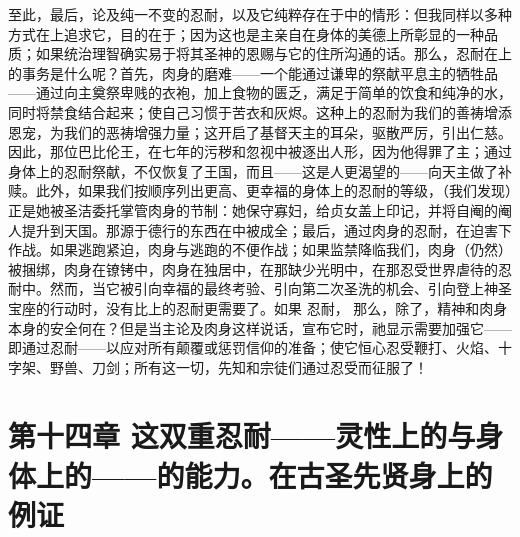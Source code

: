 至此，最后，论及纯一不变的忍耐，以及它纯粹存在于中的情形：但我同样以多种方式在上追求它，目的在于；因为这也是主亲自在身体的美德上所彰显的一种品质；如果统治理智确实易于将其圣神的恩赐与它的住所沟通的话。那么，忍耐在上的事务是什么呢？首先，肉身的磨难——一个能通过谦卑的祭献平息主的牺牲品——通过向主奠祭卑贱的衣袍，加上食物的匮乏，满足于简单的饮食和纯净的水，同时将禁食结合起来；使自己习惯于苦衣和灰烬。这种上的忍耐为我们的善祷增添恩宠，为我们的恶祷增强力量；这开启了基督天主的耳朵，驱散严厉，引出仁慈。因此，那位巴比伦王，在七年的污秽和忽视中被逐出人形，因为他得罪了主；通过身体上的忍耐祭献，不仅恢复了王国，而且——这是人更渴望的——向天主做了补赎。此外，如果我们按顺序列出更高、更幸福的身体上的忍耐的等级，（我们发现）正是她被圣洁委托掌管肉身的节制：她保守寡妇，给贞女盖上印记，并将自阉的阉人提升到天国。那源于德行的东西在中被成全；最后，通过肉身的忍耐，在迫害下作战。如果逃跑紧迫，肉身与逃跑的不便作战；如果监禁降临我们，肉身（仍然）被捆绑，肉身在镣铐中，肉身在独居中，在那缺少光明中，在那忍受世界虐待的忍耐中。然而，当它被引向幸福的最终考验、引向第二次圣洗的机会、引向登上神圣宝座的行动时，没有比上的忍耐更需要了。如果 忍耐， 那么，除了，精神和肉身本身的安全何在？但是当主论及肉身这样说话，宣布它时，祂显示需要加强它——即通过忍耐——以应对所有颠覆或惩罚信仰的准备；使它恒心忍受鞭打、火焰、十字架、野兽、刀剑；所有这一切，先知和宗徒们通过忍受而征服了！\par


\section{第十四章 这双重忍耐——灵性上的与身体上的——的能力。在古圣先贤身上的例证}

